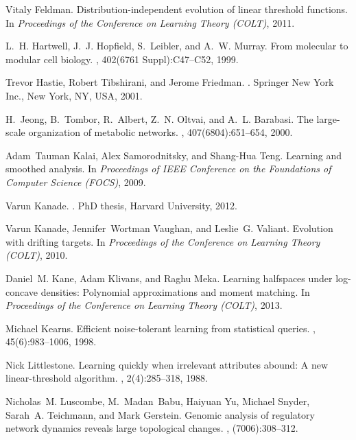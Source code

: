 \begin{thebibliography}{10}
Vitaly Feldman.
\newblock Distribution-independent evolution of linear threshold functions.
\newblock In {\em Proceedings of the Conference on Learning Theory (COLT)},
  2011.

L.~H. Hartwell, J.~J. Hopfield, S.~Leibler, and A.~W. Murray.
\newblock From molecular to modular cell biology.
, 402(6761 Suppl):C47--C52, 1999.

Trevor Hastie, Robert Tibshirani, and Jerome Friedman.
.
\newblock Springer New York Inc., New York, NY, USA, 2001.

H.~Jeong, B.~Tombor, R.~Albert, Z.~N. Oltvai, and A.~L. Barabasi.
\newblock The large-scale organization of metabolic networks.
, 407(6804):651--654, 2000.

Adam~Tauman Kalai, Alex Samorodnitsky, and Shang-Hua Teng.
\newblock Learning and smoothed analysis.
\newblock In {\em Proceedings of IEEE Conference on the Foundations of Computer
  Science (FOCS)}, 2009.

Varun Kanade.
.
\newblock PhD thesis, Harvard University, 2012.

Varun Kanade, Jennifer~Wortman Vaughan, and Leslie~G. Valiant.
\newblock Evolution with drifting targets.
\newblock In {\em Proceedings of the Conference on Learning Theory (COLT)},
  2010.

Daniel~M. Kane, Adam Klivans, and Raghu Meka.
\newblock Learning halfspaces under log-concave densities: Polynomial
  approximations and moment matching.
\newblock In {\em Proceedings of the Conference on Learning Theory (COLT)},
  2013.

\vfill\eject
{}
Michael Kearns.
\newblock Efficient noise-tolerant learning from statistical queries.
, 45(6):983--1006, 1998.

Nick Littlestone.
\newblock Learning quickly when irrelevant attributes abound: A new
  linear-threshold algorithm.
, 2(4):285--318, 1988.

Nicholas~M. Luscombe, M.~Madan~Babu, Haiyuan Yu, Michael Snyder, Sarah~A.
  Teichmann, and Mark Gerstein.
\newblock Genomic analysis of regulatory network dynamics reveals large
  topological changes.
, (7006):308--312.


\end{thebibliography}
